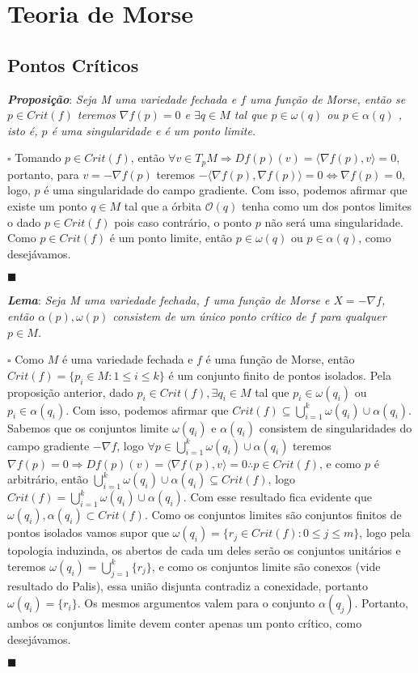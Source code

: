 \documentclass[12pt]{book}
\newcommand{\tese}[3]{\vspace{2mm} \textit{\textbf{#1}}: \textit{#2} \par $\square$ #3 \par $\blacksquare$}
\newcommand{\innerprod}[2]{\langle #1, #2 \rangle}
\begin{document}
	
	\chapter{Teoria de Morse}
	\section{Pontos Críticos}
	
	\tese{Proposição}{Seja M uma variedade fechada e $f$ uma função de Morse, então se $p \in Crit(f)$ teremos $\nabla f(p)=0$ e $\exists q \in M$ tal que $p \in \omega(q)$ ou $p \in \alpha(q)$ , isto é, $p$ é uma singularidade e é um ponto limite.}{Tomando $p \in Crit(f)$, então $\forall v \in T_{p}M \Rightarrow Df(p)(v) = \innerprod{\nabla f(p)}{v} = 0$, portanto, para $v = -\nabla f(p)$ teremos $-\innerprod{\nabla f(p)}{\nabla f(p)} = 0 \iff \nabla f(p) = 0$, logo, $p$ é uma singularidade do campo gradiente. Com isso, podemos afirmar que existe um ponto $q \in M$ tal que a órbita $\mathcal{O}(q)$ tenha como um dos pontos limites o dado $p \in Crit(f)$ pois caso contrário, o ponto $p$ não será uma singularidade. Como $p \in Crit(f)$ é um ponto limite, então $p \in \omega(q)$ ou $p \in \alpha(q)$, como desejávamos.}
	
	\tese{Lema}{Seja M uma variedade fechada, $f$ uma função de Morse e $X =-\nabla f$, então $\alpha(p), \omega(p)$ consistem de um único ponto crítico de $f$ para qualquer $p \in M$.}
	{Como $M$ é uma variedade fechada e $f$ é uma função de Morse, então $Crit(f) = \{p_{i} \in M: 1\leq i \leq k \}$ é um conjunto finito de pontos isolados. Pela proposição anterior, dado $p_{i} \in Crit(f), \exists q_{i} \in M$ tal que $p_{i} \in \omega(q_{i})$ ou $p_{i} \in \alpha(q_{i})$. Com isso, podemos afirmar que $Crit(f) \subseteq \bigcup_{i=1}^{k}\omega(q_{i}) \cup \alpha(q_{i})$. Sabemos que os conjuntos limite $\omega(q_{i})$ e $\alpha(q_{i})$ consistem de singularidades do campo gradiente $-\nabla f$, logo $\forall p \in \bigcup_{i=1}^{k}\omega(q_{i}) \cup \alpha(q_{i})$ teremos $\nabla f(p) = 0 \Rightarrow Df(p)(v) = \innerprod{\nabla f(p)}{v} = 0 \therefore p \in Crit(f)$, e como $p$ é arbitrário, então $\bigcup_{i=1}^{k}\omega(q_{i}) \cup \alpha(q_{i}) \subseteq Crit(f)$, logo $Crit(f) = \bigcup_{i=1}^{k}\omega(q_{i}) \cup \alpha(q_{i})$. Com esse resultado fica evidente que $\omega(q_{i}), \alpha(q_{i}) \subset Crit(f)$. Como os conjuntos limites são conjuntos finitos de pontos isolados vamos supor que $\omega(q_{i}) = \{r_{j} \in Crit(f): 0\leq j \leq m\}$, logo pela topologia induzinda, os abertos de cada um deles serão os conjuntos unitários e teremos $\omega(q_{i}) = \bigcup_{j=1}^{k} \{r_{j}\} $, e como os conjuntos limite são conexos (vide resultado do Palis), essa união disjunta contradiz a conexidade, portanto $\omega(q_{i}) = \{r_{i}\}$. Os mesmos argumentos valem para o conjunto $\alpha(q_{j})$. Portanto, ambos os conjuntos limite devem conter apenas um ponto crítico, como desejávamos.}
	
\end{document}

